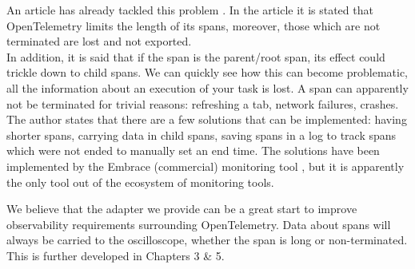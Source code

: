         An article has already tackled this problem \cite{otel-l}. In the article it is stated that OpenTelemetry limits the length of its spans, moreover, those which are not terminated are lost and not exported. \\ 
        In addition, it is said that if the span is the parent/root span, its effect could trickle down to child spans. We can quickly see how this can become problematic, all the information about an execution of your task is lost. A span can apparently not be terminated for trivial reasons: refreshing a tab, network failures, crashes. The author states that there are a few solutions that can be implemented: having shorter spans, carrying data in child spans, saving spans in a log to track spans which were not ended to manually set an end time. The solutions have been implemented by the Embrace (commercial) monitoring tool \cite{embr}, but it is apparently the only tool out of the ecosystem of monitoring tools.

     We believe that the adapter we provide can be a great start to improve observability requirements surrounding OpenTelemetry. Data about spans will always be carried to the oscilloscope, whether the span is long or non-terminated. This is further developed in Chapters 3 \& 5.
